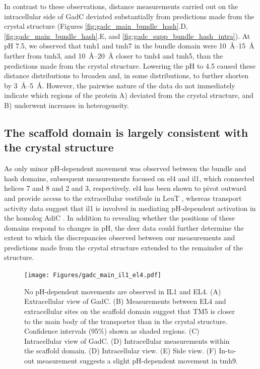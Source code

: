 In contrast to these observations, distance measurements carried out on the intracellular side of GadC deviated substantially from predictions made from the crystal structure (Figures \ref{fig:gadc_main_bundle_hash}.D, \ref{fig:gadc_main_bundle_hash}.E, and \ref{fig:gadc_supp_bundle_hash_intra}). At pH 7.5, we observed that \gls{tmh}1 and \gls{tmh}7 in the bundle domain were \SIrange{10}{15}{\angstrom} farther from \gls{tmh}3, and \SIrange{10}{20}{\angstrom} closer to \gls{tmh}4 and \gls{tmh}5, than the predictions made from the crystal structure. Lowering the pH to 4.5 caused these distance distributions to broaden and, in some distributions, to further shorten by \SIrange{3}{5}{\angstrom}. However, the pairwise nature of the data do not immediately indicate which regions of the protein A) deviated from the crystal structure, and B) underwent increases in heterogeneity.

\subsection{The scaffold domain is largely consistent with the crystal structure}

As only minor pH-dependent movement was observed between the bundle and hash domains, subsequent measurements focused on \gls{el}4 and \gls{il}1, which connected helices 7 and 8 and 2 and 3, respectively. \Gls{el}4 has been shown to pivot outward and provide access to the extracellular vestibule in LeuT \citep*{Claxton2010, Kazmier2014a}, whereas transport activity data suggest that \gls{il}1 is involved in mediating pH-dependent activation in the homolog AdiC \citep*{Wang2014}. In addition to revealing whether the positions of these domains respond to changes in pH, the \gls{deer} data could further determine the extent to which the discrepancies observed between our measurements and predictions made from the crystal structure extended to the remainder of the structure.

\begin{figure}[h!]
\centering
\texttt{[image: Figures/gadc\_main\_il1\_el4.pdf]}
 \caption[No pH-dependent movements are observed in IL1 and EL4.]{No pH-dependent movements are observed in IL1 and EL4. (A) Extracellular view of GadC. (B) Measurements between EL4 and extracellular sites on the scaffold domain suggest that TM5 is closer to the main body of the transporter than in the crystal structure. Confidence intervals (95\%) shown as shaded regions. (C) Intracellular view of GadC. (D) Intracellular measurements within the scaffold domain. (D) Intracellular view. (E) Side view. (F) In-to-out measurement suggests a slight pH-dependent movement in \gls{tmh}9.}
\label{fig:gadc_main_il1_el4}
\end{figure}

